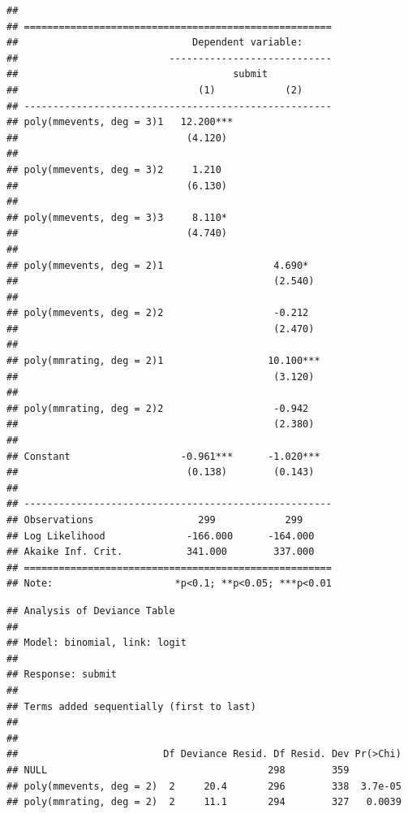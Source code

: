 \documentclass[12pt,]{article}
\begin{document}
\begin{verbatim}
## 
## =====================================================
##                              Dependent variable:     
##                          ----------------------------
##                                     submit           
##                               (1)            (2)     
## -----------------------------------------------------
## poly(mmevents, deg = 3)1   12.200***                 
##                             (4.120)                  
##                                                      
## poly(mmevents, deg = 3)2     1.210                   
##                             (6.130)                  
##                                                      
## poly(mmevents, deg = 3)3     8.110*                  
##                             (4.740)                  
##                                                      
## poly(mmevents, deg = 2)1                   4.690*    
##                                            (2.540)   
##                                                      
## poly(mmevents, deg = 2)2                   -0.212    
##                                            (2.470)   
##                                                      
## poly(mmrating, deg = 2)1                  10.100***  
##                                            (3.120)   
##                                                      
## poly(mmrating, deg = 2)2                   -0.942    
##                                            (2.380)   
##                                                      
## Constant                   -0.961***      -1.020***  
##                             (0.138)        (0.143)   
##                                                      
## -----------------------------------------------------
## Observations                  299            299     
## Log Likelihood              -166.000      -164.000   
## Akaike Inf. Crit.           341.000        337.000   
## =====================================================
## Note:                     *p<0.1; **p<0.05; ***p<0.01
\end{verbatim}

\begin{verbatim}
## Analysis of Deviance Table
## 
## Model: binomial, link: logit
## 
## Response: submit
## 
## Terms added sequentially (first to last)
## 
## 
##                         Df Deviance Resid. Df Resid. Dev Pr(>Chi)
## NULL                                      298        359         
## poly(mmevents, deg = 2)  2     20.4       296        338  3.7e-05
## poly(mmrating, deg = 2)  2     11.1       294        327   0.0039
\end{verbatim}
\end{document}
